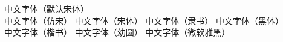 \documentclass[12pt,
	a4paper,
	utf8
	]{ctexart}
\begin{document}
\noindent 中文字体（默认宋体）\\
\fangsong 中文字体（仿宋） \songti 中文字体（宋体） \lishu 中文字体（隶书） \heiti 中文字体（黑体）\\
 中文字体（楷书）  中文字体（幼圆）  中文字体（微软雅黑）\\
\end{document}
